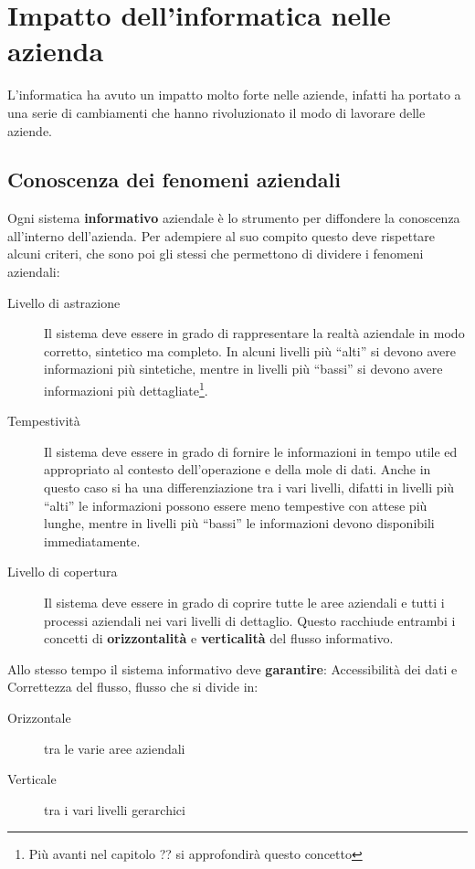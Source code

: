 \section{Impatto dell'informatica nelle azienda}
    L'informatica ha avuto un impatto molto forte nelle aziende, infatti ha portato a una serie di cambiamenti che hanno rivoluzionato il modo di lavorare delle aziende.
    \subsection{Conoscenza dei fenomeni aziendali}
        Ogni sistema \textbf{informativo} aziendale è lo strumento per diffondere la conoscenza all'interno dell'azienda. Per adempiere al suo compito questo deve rispettare alcuni criteri, che sono poi gli stessi che permettono di dividere i fenomeni aziendali:
        \begin{description}
            \item[Livello di astrazione] Il sistema deve essere in grado di rappresentare la realtà aziendale in modo corretto, sintetico ma completo. In alcuni livelli più ``alti'' si devono avere informazioni più sintetiche, mentre in livelli più ``bassi'' si devono avere informazioni più dettagliate\footnote{Più avanti nel capitolo ?? si approfondirà questo concetto}. %
            \item[Tempestività] Il sistema deve essere in grado di fornire le informazioni in tempo utile ed appropriato al contesto dell'operazione e della mole di dati. Anche in questo caso si ha una differenziazione tra i vari livelli, difatti in livelli più ``alti'' le informazioni possono essere meno tempestive con attese più lunghe, mentre in livelli più ``bassi'' le informazioni devono disponibili immediatamente.
            \item[Livello di copertura] Il sistema deve essere in grado di coprire tutte le aree aziendali e tutti i processi aziendali nei vari livelli di dettaglio. Questo racchiude entrambi i concetti di \textbf{orizzontalità} e \textbf{verticalità} del flusso informativo.
        \end{description}
        Allo stesso tempo il sistema informativo deve \textbf{garantire}: Accessibilità dei dati e Correttezza del flusso, flusso che si divide in:
        \begin{description}
            \item[Orizzontale] tra le varie aree aziendali
            \item[Verticale] tra i vari livelli gerarchici
        \end{description}
